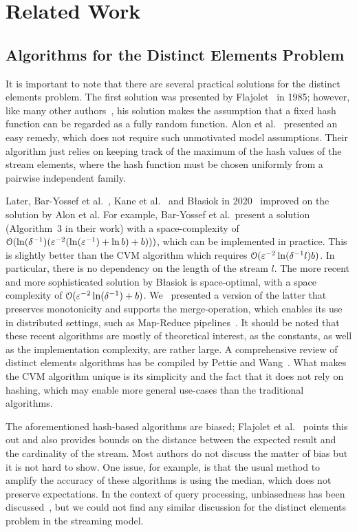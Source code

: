 \section{Related Work}\label{sec:related_work}
\subsection{Algorithms for the Distinct Elements Problem}
It is important to note that there are several practical solutions for the distinct elements problem.
The first solution was presented by Flajolet~\cite{flajolet1985} in 1985; however, like many other authors~\cite{flajolet2007,heule2013}, his solution makes the assumption that a fixed hash function can be regarded as a fully random function.
Alon et al.~\cite[Section 2.3]{alon1999} presented an easy remedy, which does not require such unmotivated model assumptions.
Their algorithm just relies on keeping track of the maximum of the hash values of the stream elements, where the hash function must be chosen uniformly from a pairwise independent family.

Later, Bar-Yossef et al.~\cite{baryossef2002}, Kane et al.~\cite{kane2010} and B\l{}asiok in 2020~\cite{blasiok2020} improved on the solution by Alon et al.
For example, Bar-Yossef et al.\ present a solution (Algorithm~3 in their work) with a space-complexity of $\operatorname{\mathcal O}(\ln (\delta^{-1}) (\varepsilon^{-2}(\ln(\varepsilon^{-1})+\ln b) + b)))$, which can be implemented in practice.
This is slightly better than the CVM algorithm which requires $\operatorname{\mathcal O}(\varepsilon^{-2} \ln (\delta^{-1}l) b)$. In particular, there is no dependency on the length of the stream $l$.
The more recent and more sophisticated solution by B\l{}asiok is space-optimal, with a space complexity of $\operatorname{\mathcal O}(\varepsilon^{-2} \ln (\delta^{-1}) + b)$.
We~\cite{karayel2023} presented a version of the latter that preserves monotonicity and supports the merge-operation, which enables its use in distributed settings, such as Map-Reduce pipelines~\cite{dean2010}.
It should be noted that these recent algorithms are mostly of theoretical interest, as the constants, as well as the implementation complexity, are rather large.
A comprehensive review of distinct elements algorithms has be compiled by Pettie and Wang~\cite[Table~1]{pettie2021}.
What makes the CVM algorithm unique is its simplicity and the fact that it does not rely on hashing, which may enable more general use-cases than the traditional algorithms.

The aforementioned hash-based algorithms are biased; Flajolet et al.~\cite{flajolet1985} points this out and also provides bounds on the distance between the expected result and the cardinality of the stream.
Most authors do not discuss the matter of bias but it is not hard to show.
One issue, for example, is that the usual method to amplify the accuracy of these algorithms is using the median, which does not preserve expectations.
In the context of query processing, unbiasedness has been discussed~\cite[Section 2.1]{haas1995}, but we could not find any similar discussion for the distinct elements problem in the streaming model.

